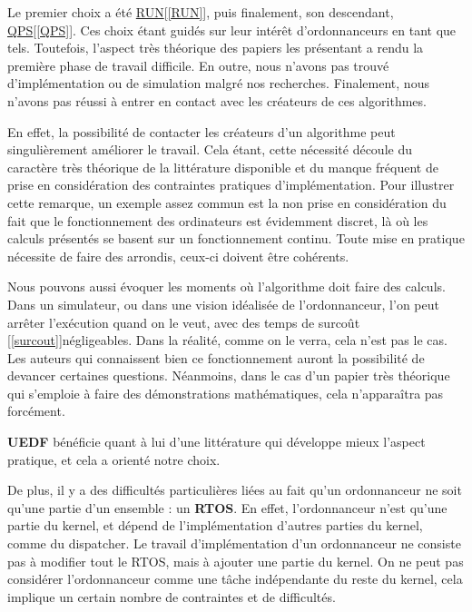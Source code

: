 	Le premier choix a été \hyperref[RUN]{RUN}[\ref*{RUN}], puis finalement, son descendant, \hyperref[QPS]{QPS}[\ref*{QPS}]. Ces choix étant guidés 
	sur leur intérêt d'ordonnanceurs en tant que tels.
	Toutefois, l'aspect très théorique des papiers les présentant a rendu la première phase de travail difficile. 
	En outre, nous n'avons pas trouvé d'implémentation ou de simulation malgré nos recherches.
	Finalement, nous n'avons pas réussi à entrer en contact avec les créateurs de ces algorithmes. \newline
	
	En effet, la possibilité de contacter les créateurs d'un algorithme peut singulièrement améliorer le 
	travail. Cela étant, cette nécessité découle du caractère très théorique de la littérature disponible
	et du manque fréquent de prise en considération des contraintes pratiques d'implémentation. 
	Pour illustrer cette remarque, un exemple assez commun est la non prise en considération 
	du fait que le fonctionnement des ordinateurs est évidemment discret, là où les 
	calculs présentés se basent sur un fonctionnement continu.
	Toute mise en pratique nécessite de faire des arrondis, ceux-ci doivent être cohérents.\newline

	Nous pouvons aussi évoquer les moments où l'algorithme doit faire des calculs. 
	Dans un simulateur, ou dans une vision idéalisée de l'ordonnanceur, l'on peut arrêter l'exécution 
	quand on le veut, avec des temps de surcoût [\ref*{surcout}]négligeables. Dans la réalité, comme on le verra, cela 
	n'est pas le cas. 
	Les auteurs qui connaissent bien ce fonctionnement auront la possibilité de devancer certaines questions.
	Néanmoins, dans le cas d'un papier très théorique qui s'emploie à faire des démonstrations mathématiques, 
	cela n'apparaîtra pas forcément.\newline
	
	\textbf{UEDF} bénéficie quant à lui d'une littérature qui développe mieux l'aspect pratique, et cela a orienté notre choix.\newline
	
	De plus, il y a des difficultés particulières liées au fait qu'un ordonnanceur ne soit qu'une partie d'un ensemble : 
	un \textbf{RTOS}. En effet, l'ordonnanceur n'est qu'une partie du kernel, et dépend de l'implémentation 
	d'autres parties du kernel, comme du dispatcher. Le travail d'implémentation d'un ordonnanceur ne consiste 
	pas à modifier tout le RTOS, mais à ajouter une partie du kernel. On ne peut 
	pas considérer l'ordonnanceur comme une tâche indépendante du reste du kernel, cela 
	implique un certain nombre de contraintes et de difficultés.\newline
	
